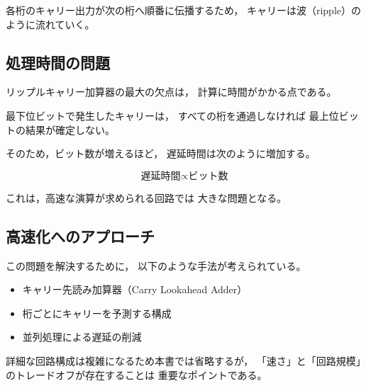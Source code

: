 各桁のキャリー出力が次の桁へ順番に伝播するため，
キャリーは波（ripple）のように流れていく。

\subsection{処理時間の問題}

リップルキャリー加算器の最大の欠点は，
計算に時間がかかる点である。

最下位ビットで発生したキャリーは，
すべての桁を通過しなければ
最上位ビットの結果が確定しない。

そのため，ビット数が増えるほど，
遅延時間は次のように増加する。

\[
\text{遅延時間} \propto \text{ビット数}
\]

これは，高速な演算が求められる回路では
大きな問題となる。

\subsection{高速化へのアプローチ}

この問題を解決するために，
以下のような手法が考えられている。

\begin{itemize}
  \item キャリー先読み加算器（Carry Lookahead Adder）
  \item 桁ごとにキャリーを予測する構成
  \item 並列処理による遅延の削減
\end{itemize}

詳細な回路構成は複雑になるため本書では省略するが，
「速さ」と「回路規模」のトレードオフが存在することは
重要なポイントである。